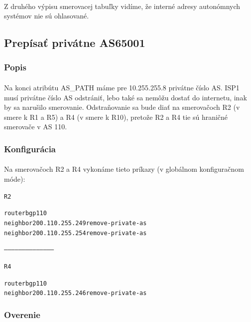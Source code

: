 \documentclass[12pt,twoside,a4paper]{report}
\begin{document}
\paragraph{}
Z druhého výpisu smerovacej tabuľky vidíme, že interné adresy autonómnych systémov nie sú ohlasované.





\subsection{Prepísať privátne AS65001}
\subsubsection{Popis}
\paragraph{}
Na konci atribútu AS\_PATH máme pre 10.255.255.8 privátne číslo AS. ISP1 musí privátne číslo AS odstrániť, lebo také sa nemôžu dostať do internetu, inak by sa narušilo smerovanie. Odstraňovanie sa bude diať na smerovačoch R2 (v smere k R1 a R5) a R4 (v smere k R10), pretože R2 a R4 tie sú hraničné smerovače v AS 110.



\subsubsection{Konfigurácia}
\paragraph{}
Na smerovačoch R2 a R4 vykonáme tieto príkazy (v globálnom konfiguračnom móde):

\noindent
{\selectfont
\begin{small}
\begin{alltt}
R2

router bgp 110
neighbor 200.110.255.249 remove-private-as
neighbor 200.110.255.254 remove-private-as

------------------------------------------

R4

router bgp 110
neighbor 200.110.255.246 remove-private-as
\end{alltt}
\end{small}
}


\subsubsection{Overenie}
\end{document}
